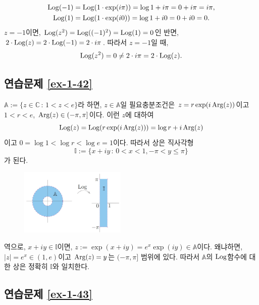 \begin{align*}
\mathop{\mathrm{Log}}(-1) &= \mathop{\mathrm{Log}}(1\cdot \exp(i\pi)) = \log1 +i\pi = 0 + i\pi = i\pi, \\
\mathop{\mathrm{Log}}(1) &= \mathop{\mathrm{Log}}(1\cdot \exp(i0)) = \log 1 + i0 = 0 + i0 = 0.
\end{align*}
$z=-1$이면,
$\mathop{\mathrm{Log}}(z^2) = \mathop{\mathrm{Log}}((-1)^2) = \mathop{\mathrm{Log}}(1) = 0$인 반면,
$2\cdot\mathop{\mathrm{Log}}(z) = 2\cdot \mathop{\mathrm{Log}}(-1) = 2\cdot i\pi$. 
따라서 $z=-1$일 때,
\[
\mathop{\mathrm{Log}}(z^2) = 0 \ne 2\cdot i\pi = 2\cdot \mathop{\mathrm{Log}}(z).
\]

\subsection*{연습문제 \ref{ex-1-42}}

$\mathbb A:= \{ z \in \mathbb C \,:\, 1 < z < e \}$라 하면,
$z\in \mathbb A$일 필요충분조건은 $ z=r\exp(i\mathop{\mathrm{Arg}}(z))$이고
$1<r<e$, $\mathop{\mathrm{Arg}}(z)\in (-\pi,\pi]$이다.
이런 $z$에 대하여
\[
\mathop{\mathrm{Log}}(z) = \mathop{\mathrm{Log}}(r\exp(i\mathop{\mathrm{Arg}}(z))) = \log r + i\mathop{\mathrm{Arg}}(z)
\]
이고 $0=\log 1 < \log r < \log e = 1$이다.
따라서 상은 직사각형
\[
\mathbb I := \{ x+iy\,:\, 0<x<1, -\pi <y\le \pi \}
\]
가 된다.

\begin{figure}[h!]
\begin{center}
\includegraphics[width=0.45\textwidth]{./Solution/figs/fig-s-0-5}
\end{center}
\end{figure}

역으로, $x+iy\in\mathbb I$이면,
$z:= \exp(x+iy) = e^x\exp(iy)\in \mathbb A$이다.
왜냐하면, $|z|=e^x \in (1,e)$이고 
$\mathop{\mathrm{Arg}}(z) = y$는 $(-\pi,\pi]$ 범위에 있다.
따라서 $\mathbb A$의 $\mathop{\mathrm{Log}}$함수에 대한 상은 정확히 $\mathbb I$와 일치한다.

\subsection*{연습문제 \ref{ex-1-43}}

